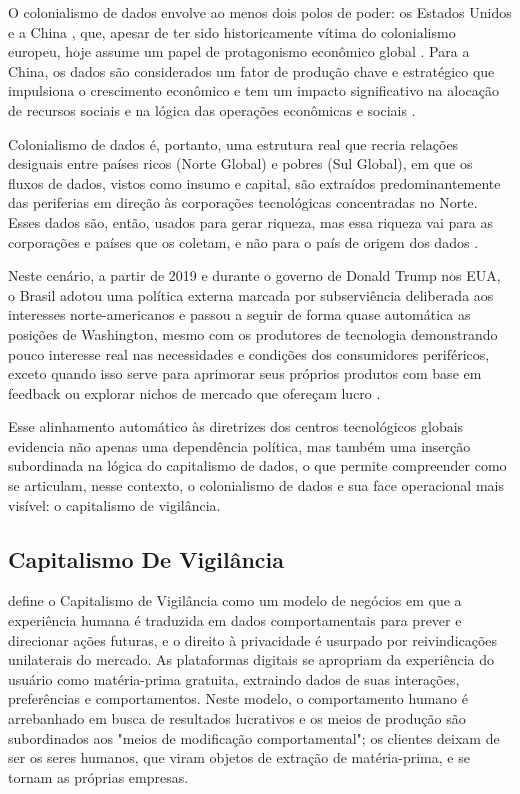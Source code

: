 O colonialismo de dados envolve ao menos dois polos de poder: os Estados Unidos e a China \cite{couldry2018}, que, apesar de ter sido historicamente vítima do colonialismo europeu, hoje assume um papel de protagonismo econômico global \cite{Silveira2021}.  Para a China, os dados são considerados um fator de produção chave e estratégico que impulsiona o crescimento econômico e tem um impacto significativo na alocação de recursos sociais e na lógica das operações econômicas e sociais \cite{feifei2024}.


Colonialismo de dados é, portanto, uma estrutura real que recria relações desiguais entre países ricos (Norte Global) e pobres (Sul Global), em que os fluxos de dados, vistos como insumo e capital, são extraídos predominantemente das periferias em direção às corporações tecnológicas concentradas no Norte. Esses dados são, então, usados para gerar riqueza, mas essa riqueza vai para as corporações e países que os coletam, e não para o país de origem dos dados \cite{Silveira2021}.

Neste cenário, a partir de 2019 e durante o governo de Donald Trump nos EUA, o Brasil adotou uma política externa marcada por subserviência deliberada aos interesses norte-americanos e passou a seguir de forma quase automática as posições de Washington, mesmo com os produtores de tecnologia demonstrando pouco interesse real nas necessidades e condições dos consumidores periféricos, exceto quando isso serve para aprimorar seus próprios produtos com base em feedback ou explorar nichos de mercado que ofereçam lucro \cite{Silveira2021}.

Esse alinhamento automático às diretrizes dos centros tecnológicos globais evidencia não apenas uma dependência política, mas também uma inserção subordinada na lógica do capitalismo de dados, o que permite compreender como se articulam, nesse contexto, o colonialismo de dados e sua face operacional mais visível: o capitalismo de vigilância.

\subsection{Capitalismo De Vigilância}
\label{subsec:capVigilancia}

 define o Capitalismo de Vigilância como um modelo de negócios em que a experiência humana é traduzida em dados comportamentais para prever e direcionar ações futuras, e o direito à privacidade é usurpado por reivindicações unilaterais do mercado. As plataformas digitais se apropriam da experiência do usuário como matéria-prima gratuita, extraindo dados de suas interações, preferências e comportamentos. Neste modelo, o comportamento humano é arrebanhado em busca de resultados lucrativos e os meios de produção são subordinados aos "meios de modificação comportamental"; os clientes deixam de ser os seres humanos, que viram objetos de extração de matéria-prima, e se tornam as próprias empresas.

